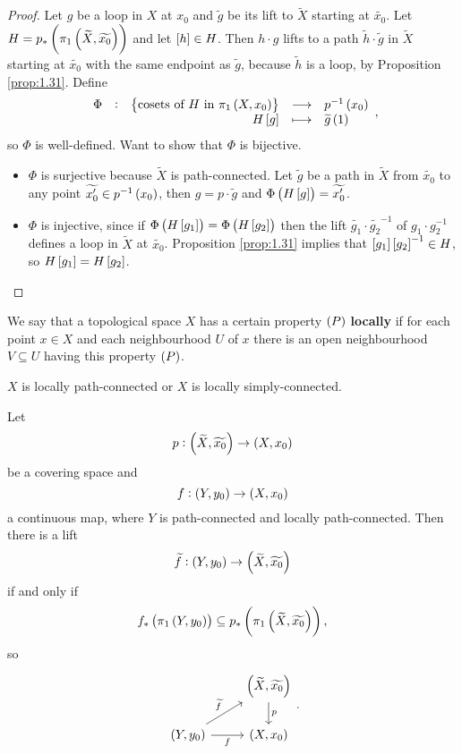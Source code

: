 \begin{proof}
Let $ g $ be a loop in $ X $ at $ x_0 $ and $ \widetilde{g} $ be its lift to $ \widetilde{X} $ starting at $ \widetilde{x_0} $. Let $ H = p_*\br{\pi_1\br{\widetilde{X}, \widetilde{x_0}}} $ and let $ \sbr{h} \in H $. Then $ h \cdot g $ lifts to a path $ \widetilde{h} \cdot \widetilde{g} $ in $ \widetilde{X} $ starting at $ \widetilde{x_0} $ with the same endpoint as $ \widetilde{g} $, because $ \widetilde{h} $ is a loop, by Proposition \ref{prop:1.31}. Define
$$ \function[\Phi]{\cbr{\text{cosets of} \ H \ \text{in} \ \pi_1\br{X, x_0}}}{p^{-1}\br{x_0}}{H\sbr{g}}{\widetilde{g}\br{1}}, $$
so $ \Phi $ is well-defined. Want to show that $ \Phi $ is bijective.
\begin{itemize}
\item $ \Phi $ is surjective because $ \widetilde{X} $ is path-connected. Let $ \widetilde{g} $ be a path in $ \widetilde{X} $ from $ \widetilde{x_0} $ to any point $ \widetilde{x_0'} \in p^{-1}\br{x_0} $, then $ g = p \cdot \widetilde{g} $ and $ \Phi\br{H\sbr{g}} = \widetilde{x_0'} $.
\item $ \Phi $ is injective, since if $ \Phi\br{H\sbr{g_1}} = \Phi\br{H\sbr{g_2}} $ then the lift $ \widetilde{g_1} \cdot \widetilde{g_2}^{-1} $ of $ g_1 \cdot g_2^{-1} $ defines a loop in $ \widetilde{X} $ at $ \widetilde{x_0} $. Proposition \ref{prop:1.31} implies that $ \sbr{g_1}\sbr{g_2}^{-1} \in H $, so $ H\sbr{g_1} = H\sbr{g_2} $.
\end{itemize}
\end{proof}

\pagebreak

We say that a topological space $ X $ has a certain property $ \br{P} $ \textbf{locally} if for each point $ x \in X $ and each neighbourhood $ U $ of $ x $ there is an open neighbourhood $ V \subseteq U $ having this property $ \br{P} $.

\begin{example*}
$ X $ is locally path-connected or $ X $ is locally simply-connected.
\end{example*}

\begin{proposition}
\label{prop:1.33}
Let
$$ p : \br{\widetilde{X}, \widetilde{x_0}} \to \br{X, x_0} $$
be a covering space and
$$ f : \br{Y, y_0} \to \br{X, x_0} $$
a continuous map, where $ Y $ is path-connected and locally path-connected. Then there is a lift
$$ \widetilde{f} : \br{Y, y_0} \to \br{\widetilde{X}, \widetilde{x_0}} $$
if and only if
$$ f_*\br{\pi_1\br{Y, y_0}} \subseteq p_*\br{\pi_1\br{\widetilde{X}, \widetilde{x_0}}}, $$
so
$$
\begin{tikzcd}
& \br{\widetilde{X}, \widetilde{x_0}} \arrow{d}{p} \\
\br{Y, y_0} \arrow{ur}{\widetilde{f}} \arrow[swap]{r}{f} & \br{X, x_0}
\end{tikzcd}.
$$
\end{proposition}


